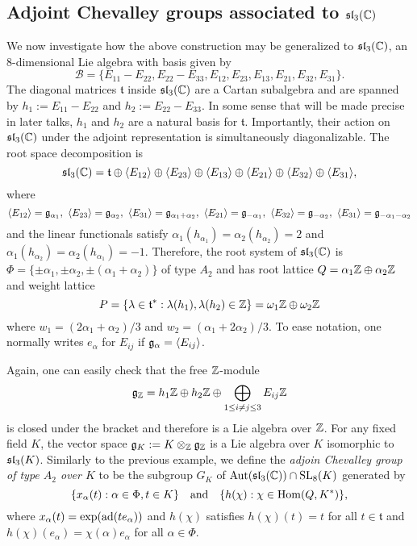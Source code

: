 \subsection{Adjoint Chevalley groups associated to \texorpdfstring{$\mathfrak{sl}_3(\mathbb{C})$}{PDFstring}}
We now investigate how the above construction may be generalized to $\mathfrak{sl}_3(\mathbb{C})$, an $8$-dimensional Lie algebra with basis given by
$$\mathcal{B}=\{E_{11}-E_{22},E_{22}-E_{33},E_{12},E_{23},E_{13},E_{21},E_{32},E_{31}\}.$$
The diagonal matrices $\mathfrak{t}$ inside $\mathfrak{sl}_3(\mathbb{C})$ are a Cartan subalgebra and are spanned by $h_1:=E_{11}-E_{22}$ and $h_2:=E_{22}-E_{33}$. In some sense that will be made precise in later talks, $h_1$ and $h_2$ are a natural basis for $\mathfrak{t}$. Importantly, their action on $\mathfrak{sl}_3(\mathbb{C})$ under the adjoint representation is simultaneously diagonalizable. The root space decomposition is 
$$\mathfrak{sl}_3(\mathbb{C})=\mathfrak{t}\oplus\langle E_{12}\rangle\oplus\langle E_{23}\rangle\oplus\langle E_{13}\rangle\oplus\langle E_{21}\rangle\oplus\langle E_{32}\rangle\oplus\langle E_{31}\rangle,$$
where
$$\langle E_{12}\rangle=\fg_{\alpha_1},\ \langle E_{23}\rangle=\fg_{\alpha_2},\ \langle E_{31}\rangle=\fg_{\alpha_1+\alpha_2},\ \langle E_{21}\rangle=\fg_{-\alpha_1},\ \langle E_{32}\rangle=\fg_{-\alpha_2},\ \langle E_{31}\rangle=\fg_{-\alpha_1-\alpha_2}$$
and the linear functionals satisfy 
$\alpha_1(h_{\alpha_1})=\alpha_2(h_{\alpha_2})=2$ and $\alpha_1(h_{\alpha_2})=\alpha_2(h_{\alpha_1})=-1$. Therefore, the root system of $\mathfrak{sl}_3(\mathbb{C})$ is $\Phi=\{\pm\alpha_1,\pm\alpha_2,\pm(\alpha_1+\alpha_2)\}$ of type $A_2$ and has root lattice $Q=\alpha_1\mathbb{Z}\oplus\alpha_2\mathbb{Z}$ and weight lattice $$P=\{\lambda\in\mathfrak{t}^*:\lambda(h_1),\lambda(h_2)\in\mathbb{Z}\}=\omega_1\mathbb{Z}\oplus\omega_2\mathbb{Z}$$ where $w_1=(2\alpha_1+\alpha_2)/3$ and $w_2=(\alpha_1+2\alpha_2)/3$. To ease notation, one normally writes $e_\alpha$ for $E_{ij}$ if $\mathfrak{g}_\alpha=\langle E_{ij}\rangle$.

Again, one can easily check that the free $\mathbb{Z}$-module
$$\mathfrak{g}_{\mathbb{Z}}=h_1\mathbb{Z}\oplus h_2\mathbb{Z}\oplus\bigoplus_{1\leq i\neq j\leq 3}E_{ij}\mathbb{Z}$$
is closed under the bracket and therefore is a Lie algebra over $\mathbb{Z}$.
For any fixed field $K$, the vector space $\mathfrak{g}_K:=K\otimes_{\mathbb{Z}}\mathfrak{g}_{\mathbb{Z}}$ is a Lie algebra over $K$ isomorphic to $\mathfrak{sl}_3(K)$.
Similarly to the previous example, we define the \textit{adjoin Chevalley group of type $A_2$ over $K$} to be the subgroup $G_K$ of $\mathrm{Aut}(\mathfrak{sl}_3(\mathbb{C}))\cap\mathrm{SL}_8(K)$ generated by
$$\{x_\alpha(t):\alpha\in\Phi,t\in K\}\quad\text{and}\quad\{h(\chi):\chi\in\mathrm{Hom}(Q,K^*)\},$$ where $x_\alpha(t)=\exp(\mathrm{ad}(te_\alpha))$ and $h(\chi)$ satisfies $h(\chi)(t)=t$ for all $t\in\mathfrak{t}$ and $h(\chi)(e_\alpha)=\chi(\alpha)e_\alpha$ for all $\alpha\in\Phi$. 

